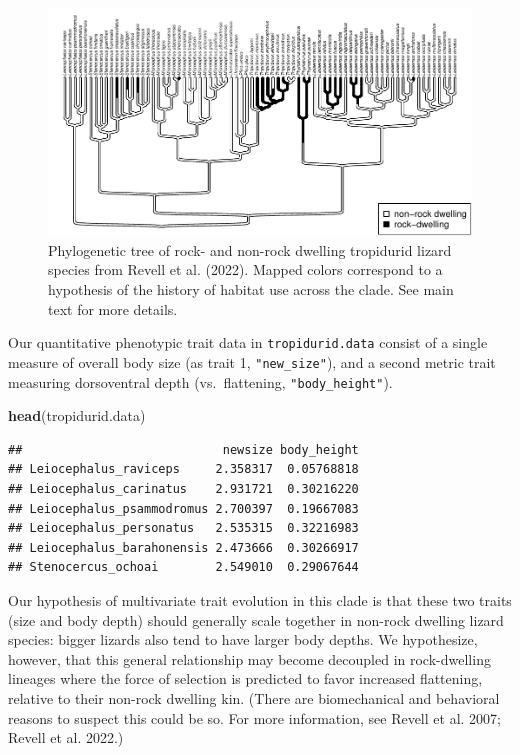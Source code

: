 \documentclass[fleqn,10pt,lineno]{wlpeerj} %
\newenvironment{Shaded}{\begin{snugshade}}{\end{snugshade}}
\newcommand{\FunctionTok}[1]{\textcolor[rgb]{0.13,0.29,0.53}{\textbf{#1}}}
\newcommand{\NormalTok}[1]{#1}
\begin{document}
\begin{figure}
\includegraphics[width=1\linewidth]{Revell.phytools-v2_peerj_files/figure-latex/trop-tree-1} \caption{Phylogenetic tree of rock- and non-rock dwelling tropidurid lizard species from Revell et al. (2022). Mapped colors correspond to a hypothesis of the history of habitat use across the clade. See main text for more details.}\label{fig:trop-tree}
\end{figure}

Our quantitative phenotypic trait data in \texttt{tropidurid.data} consist of a single measure of overall body size (as trait 1, \texttt{"new\_size"}), and a second metric trait measuring dorsoventral depth (vs.~flattening, \texttt{"body\_height"}).

\begin{Shaded}
\begin{Highlighting}[]
\FunctionTok{head}\NormalTok{(tropidurid.data)}
\end{Highlighting}
\end{Shaded}

\begin{verbatim}
##                            newsize body_height
## Leiocephalus_raviceps     2.358317  0.05768818
## Leiocephalus_carinatus    2.931721  0.30216220
## Leiocephalus_psammodromus 2.700397  0.19667083
## Leiocephalus_personatus   2.535315  0.32216983
## Leiocephalus_barahonensis 2.473666  0.30266917
## Stenocercus_ochoai        2.549010  0.29067644
\end{verbatim}

Our hypothesis of multivariate trait evolution in this clade is that these two traits (size and body depth) should generally scale together in non-rock dwelling lizard species: bigger lizards also tend to have larger body depths. We hypothesize, however, that this general relationship may become decoupled in rock-dwelling lineages where the force of selection is predicted to favor increased flattening, relative to their non-rock dwelling kin. (There are biomechanical and behavioral reasons to suspect this could be so. For more information, see Revell et al. 2007; Revell et al. 2022.)
\end{document}
